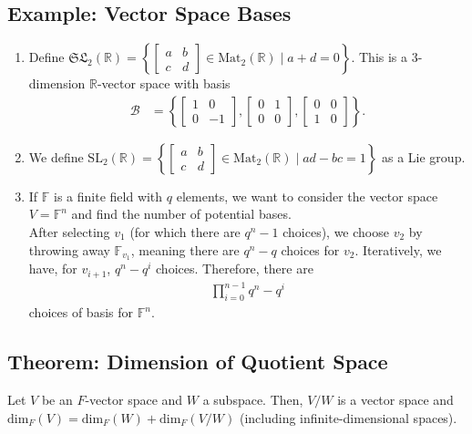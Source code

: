 \documentclass[10pt]{extarticle}
\newcommand{\R}{\mathbb{R}}
\begin{document}
  \subsection{Example: Vector Space Bases}%
  \begin{enumerate}[(1)]
    \item Define $\mathfrak{SL}_2(\R) = \left\{ \begin{bmatrix}a&b\\c&d\end{bmatrix}\in \text{Mat}_2(\R)\mid a+d = 0\right\}$. This is a 3-dimension $\R$-vector space with basis
      \begin{align*}
        \mathcal{B} &= \left\{ \begin{bmatrix}1&0\\0&-1\end{bmatrix}, \begin{bmatrix}0&1\\0&0\end{bmatrix}, \begin{bmatrix}0&0\\1&0\end{bmatrix}\right\}.
      \end{align*}
    \item We define $\text{SL}_2(\R) = \left\{ \begin{bmatrix}a&b\\c&d\end{bmatrix}\in \text{Mat}_2(\R)\mid ad-bc = 1\right\}$ as a Lie group.
    \item If $\mathbb{F}$ is a finite field with $q$ elements, we want to consider the vector space $V = \mathbb{F}^n$ and find the number of potential bases.\\

      After selecting $v_1$ (for which there are $q^n-1$ choices), we choose $v_2$ by throwing away $\mathbb{F}_{v_1}$, meaning there are $q^n - q$ choices for $v_2$. Iteratively, we have, for $v_{i+1}$, $q^{n}-q^i$ choices. Therefore, there are 
      \begin{align*}
        \prod_{i=0}^{n-1}q^n-q^i
      \end{align*}
      choices of basis for $\mathbb{F}^n$.
  \end{enumerate}
  \subsection{Theorem: Dimension of Quotient Space}%
  Let $V$ be an $F$-vector space and $W$ a subspace. Then, $V/W$ is a vector space and $\text{dim}_F(V) = \text{dim}_F(W) + \text{dim}_F(V/W)$ (including infinite-dimensional spaces).\\
\end{document}
